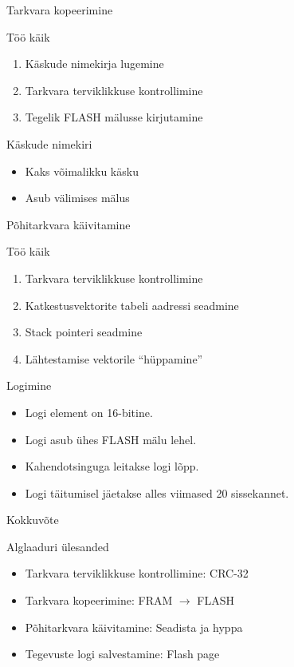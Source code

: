 \documentclass[pdf]{beamer}
\begin{document}
\begin{frame}{Tarkvara kopeerimine}
	\begin{block}{Töö käik}
		\begin{enumerate}
			\item Käskude nimekirja lugemine
			\item Tarkvara terviklikkuse kontrollimine
			\item Tegelik FLASH mälusse kirjutamine
		\end{enumerate}
	\end{block}
	\begin{block}{Käskude nimekiri}
		\begin{itemize}
			\item Kaks võimalikku käsku
			\item Asub välimises mälus
		\end{itemize}
	\end{block}
\end{frame}

\begin{frame}{Põhitarkvara käivitamine}
	\begin{block}{Töö käik}
		\begin{enumerate}
			\item Tarkvara terviklikkuse kontrollimine
			\item Katkestusvektorite tabeli aadressi seadmine
			\item Stack pointeri seadmine
			\item Lähtestamise vektorile ``hüppamine''
		\end{enumerate}
	\end{block}
\end{frame}

\begin{frame}{Logimine}
	\begin{itemize}
		\item Logi element on 16-bitine.
		\item Logi asub ühes FLASH mälu lehel.
		\item Kahendotsinguga leitakse logi lõpp.
		\item Logi täitumisel jäetakse alles viimased 20 sissekannet.
	\end{itemize}
\end{frame}

\begin{frame}{Kokkuvõte}
	\begin{block}{Alglaaduri ülesanded}
		\begin{itemize}
			\item Tarkvara terviklikkuse kontrollimine: \alert{CRC-32}
			\item Tarkvara kopeerimine: \alert{FRAM \(\to\) FLASH}
			\item Põhitarkvara käivitamine: \alert{Seadista ja hyppa}
			\item Tegevuste logi salvestamine: \alert{Flash page}
		\end{itemize}
	\end{block}
\end{frame}
\end{document}
